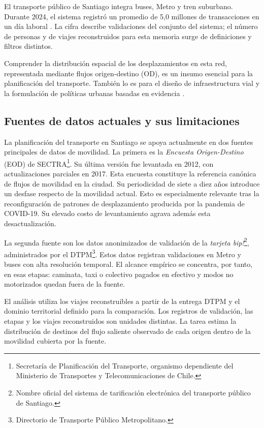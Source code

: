 \label{sec:cap1}

El transporte público de Santiago integra buses, Metro y tren suburbano. Durante 2024, el sistema registró un promedio de 5,0 millones de transacciones en un día laboral \cite{dtpm_informe_2024}. La cifra describe validaciones del conjunto del sistema; el número de personas y de viajes reconstruidos para esta memoria surge de definiciones y filtros distintos.

Comprender la distribución espacial de los desplazamientos en esta red, representada mediante flujos origen-destino (OD), es un insumo esencial para la planificación del transporte. También lo es para el diseño de infraestructura vial y la formulación de políticas urbanas basadas en evidencia \cite{liu2024interdisciplinary}.

\subsection{Fuentes de datos actuales y sus limitaciones}
\label{sec:fuentes_movilidad}

La planificación del transporte en Santiago se apoya actualmente en dos fuentes principales de datos de movilidad. La primera es la \textit{Encuesta Origen-Destino} (EOD) de SECTRA\footnote{Secretaría de Planificación del Transporte, organismo dependiente del Ministerio de Transportes y Telecomunicaciones de Chile.}. Su última versión fue levantada en 2012, con actualizaciones parciales en 2017. Esta encuesta constituye la referencia canónica de flujos de movilidad en la ciudad. Su periodicidad de siete a diez años introduce un desfase respecto de la movilidad actual. Esto es especialmente relevante tras la reconfiguración de patrones de desplazamiento producida por la pandemia de COVID-19. Su elevado costo de levantamiento agrava además esta desactualización.

La segunda fuente son los datos anonimizados de validación de la \textit{tarjeta bip!}\footnote{Nombre oficial del sistema de tarificación electrónica del transporte público de Santiago.}, administrados por el DTPM\footnote{Directorio de Transporte Público Metropolitano.}. Estos datos registran validaciones en Metro y buses con alta resolución temporal. El alcance empírico se concentra, por tanto, en esas etapas: caminata, taxi o colectivo pagados en efectivo y modos no motorizados quedan fuera de la fuente.

El análisis utiliza los viajes reconstruibles a partir de la entrega DTPM y el dominio territorial definido para la comparación. Los registros de validación, las etapas y los viajes reconstruidos son unidades distintas. La tarea estima la distribución de destinos del flujo saliente observado de cada origen dentro de la movilidad cubierta por la fuente.

